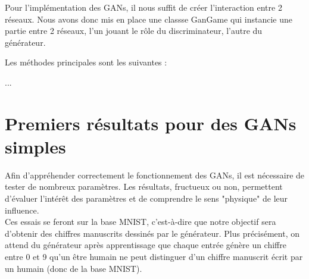 Pour l'implémentation des GANs, il nous suffit de créer l'interaction entre 2 réseaux. Nous avons donc mis en place une classse GanGame qui instancie une partie entre 2 réseaux, l'un jouant le rôle du discriminateur, l'autre du générateur. 

Les méthodes principales sont les suivantes : 

...

\section{Premiers résultats pour des GANs simples}
	Afin d'appréhender correctement le fonctionnement des GANs, il est nécessaire de tester de nombreux paramètres. Les résultats, fructueux ou non, permettent d'évaluer l'intérêt des paramètres et de comprendre le sens "physique" de leur influence.\\
	Ces essais se feront sur la base MNIST, c'est-à-dire que notre objectif sera d'obtenir des chiffres manuscrits dessinés par le générateur. Plus précisément, on attend du générateur après apprentissage que chaque entrée génère un chiffre entre 0 et 9 qu'un être humain ne peut distinguer d'un chiffre manuscrit écrit par un humain (donc de la base MNIST).

